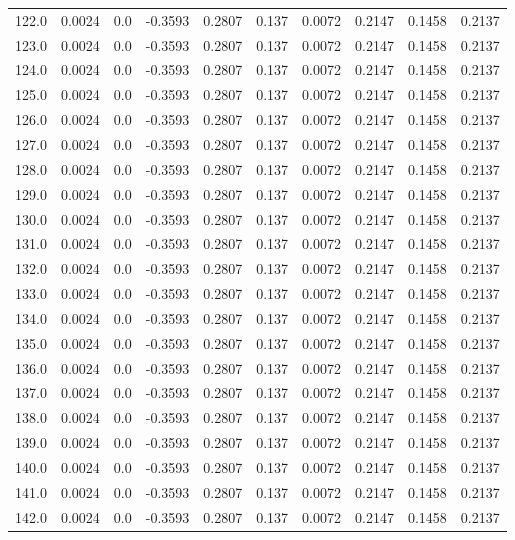 \begin{longtable}{lrrrrrrrrr}
122.0 & 0.0024 & 0.0 & -0.3593 & 0.2807 & 0.137 & 0.0072 & 0.2147 & 0.1458 & 0.2137 \\
123.0 & 0.0024 & 0.0 & -0.3593 & 0.2807 & 0.137 & 0.0072 & 0.2147 & 0.1458 & 0.2137 \\
124.0 & 0.0024 & 0.0 & -0.3593 & 0.2807 & 0.137 & 0.0072 & 0.2147 & 0.1458 & 0.2137 \\
125.0 & 0.0024 & 0.0 & -0.3593 & 0.2807 & 0.137 & 0.0072 & 0.2147 & 0.1458 & 0.2137 \\
126.0 & 0.0024 & 0.0 & -0.3593 & 0.2807 & 0.137 & 0.0072 & 0.2147 & 0.1458 & 0.2137 \\
127.0 & 0.0024 & 0.0 & -0.3593 & 0.2807 & 0.137 & 0.0072 & 0.2147 & 0.1458 & 0.2137 \\
128.0 & 0.0024 & 0.0 & -0.3593 & 0.2807 & 0.137 & 0.0072 & 0.2147 & 0.1458 & 0.2137 \\
129.0 & 0.0024 & 0.0 & -0.3593 & 0.2807 & 0.137 & 0.0072 & 0.2147 & 0.1458 & 0.2137 \\
130.0 & 0.0024 & 0.0 & -0.3593 & 0.2807 & 0.137 & 0.0072 & 0.2147 & 0.1458 & 0.2137 \\
131.0 & 0.0024 & 0.0 & -0.3593 & 0.2807 & 0.137 & 0.0072 & 0.2147 & 0.1458 & 0.2137 \\
132.0 & 0.0024 & 0.0 & -0.3593 & 0.2807 & 0.137 & 0.0072 & 0.2147 & 0.1458 & 0.2137 \\
133.0 & 0.0024 & 0.0 & -0.3593 & 0.2807 & 0.137 & 0.0072 & 0.2147 & 0.1458 & 0.2137 \\
134.0 & 0.0024 & 0.0 & -0.3593 & 0.2807 & 0.137 & 0.0072 & 0.2147 & 0.1458 & 0.2137 \\
135.0 & 0.0024 & 0.0 & -0.3593 & 0.2807 & 0.137 & 0.0072 & 0.2147 & 0.1458 & 0.2137 \\
136.0 & 0.0024 & 0.0 & -0.3593 & 0.2807 & 0.137 & 0.0072 & 0.2147 & 0.1458 & 0.2137 \\
137.0 & 0.0024 & 0.0 & -0.3593 & 0.2807 & 0.137 & 0.0072 & 0.2147 & 0.1458 & 0.2137 \\
138.0 & 0.0024 & 0.0 & -0.3593 & 0.2807 & 0.137 & 0.0072 & 0.2147 & 0.1458 & 0.2137 \\
139.0 & 0.0024 & 0.0 & -0.3593 & 0.2807 & 0.137 & 0.0072 & 0.2147 & 0.1458 & 0.2137 \\
140.0 & 0.0024 & 0.0 & -0.3593 & 0.2807 & 0.137 & 0.0072 & 0.2147 & 0.1458 & 0.2137 \\
141.0 & 0.0024 & 0.0 & -0.3593 & 0.2807 & 0.137 & 0.0072 & 0.2147 & 0.1458 & 0.2137 \\
142.0 & 0.0024 & 0.0 & -0.3593 & 0.2807 & 0.137 & 0.0072 & 0.2147 & 0.1458 & 0.2137 \\

\end{longtable}
